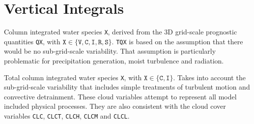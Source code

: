 \section{Vertical Integrals}
\begin{description}[leftmargin=3.0cm,style=sameline]
 \item [TQX]      Column integrated water species \texttt{X}, derived from the 3D grid-scale prognostic quantities \texttt{QX}, 
                  with $\texttt{X}\in \{\texttt{V}, \texttt{C}, \texttt{I}, \texttt{R}, \texttt{S}\}$. \texttt{TQX} is based 
                  on the assumption that there would be no sub-grid-scale variability. That assumption is particularly problematic 
                  for precipitation generation, moist turbulence and radiation.

 \item [TQX\_DIA] Total column integrated water species \texttt{X}, with $\texttt{X}\in \{\texttt{C}, \texttt{I}\}$. 
                  Takes into account the sub-grid-scale variability that includes simple treatments of turbulent motion and convective 
                  detrainment. These cloud variables attempt to represent all model included physical processes. They are also 
                  consistent with the cloud cover variables \texttt{CLC}, \texttt{CLCT}, \texttt{CLCH}, \texttt{CLCM} and \texttt{CLCL}. 
\end{description}


